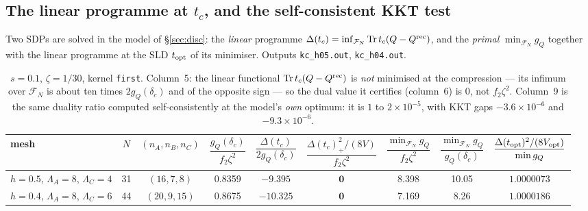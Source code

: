 \documentclass[11pt]{article}
\begin{document}
\subsection{The linear programme at $t_c$, and the self-consistent KKT test}
\label{sec:LP}
Two SDPs are solved in the model of \S\ref{sec:disc}: the \emph{linear} programme
$\Delta(t_c)=\inf_{\mathcal F_N}\operatorname{Tr} t_c(Q-Q^{\rm rec})$, and the \emph{primal}
$\min_{\mathcal F_N}g_Q$ together with the linear programme at the SLD $t_{\rm opt}$ of its
minimiser.  Outputs \texttt{kc\_h05.out}, \texttt{kc\_h04.out}.

\begin{table}[h]\centering\small
\begin{tabular}{lcccccccc}
\toprule
mesh&$N$&$(n_A,n_B,n_C)$&$\dfrac{g_Q(\delta_c)}{f_2\zeta^2}$&$\dfrac{\Delta(t_c)}{2g_Q(\delta_c)}$&
$\dfrac{\Delta(t_c)_+^2/(8V)}{f_2\zeta^2}$&$\dfrac{\min_{\mathcal F_N}g_Q}{f_2\zeta^2}$&
$\dfrac{\min_{\mathcal F_N}g_Q}{g_Q(\delta_c)}$&$\dfrac{\Delta(t_{\rm opt})^2/(8V_{\rm opt})}{\min g_Q}$\\
\midrule
$h{=}0.5$, $\Lambda_A{=}8$, $\Lambda_C{=}4$&31&$(16,7,8)$&0.8359&$-9.395$&$\mathbf 0$&8.398&10.05&$1.0000073$\\
$h{=}0.4$, $\Lambda_A{=}8$, $\Lambda_C{=}6$&44&$(20,9,15)$&0.8675&$-10.325$&$\mathbf 0$&7.169&8.26&$1.0000186$\\
\bottomrule
\end{tabular}
\caption{$s=0.1$, $\zeta=1/30$, kernel \texttt{first}.  Column~5: the linear functional
$\operatorname{Tr} t_c(Q-Q^{\rm rec})$ is \emph{not} minimised at the compression --- its infimum over
$\mathcal F_N$ is about ten times $2g_Q(\delta_c)$ and of the opposite sign --- so the dual value it
certifies (column~6) is $0$, not $f_2\zeta^2$.  Column~9 is the same duality ratio computed
self-consistently at the model's \emph{own} optimum: it is $1$ to $2\times10^{-5}$, with KKT gaps
$-3.6\times10^{-6}$ and $-9.3\times10^{-6}$.}
\label{tab:LPtc}
\end{table}
\end{document}
